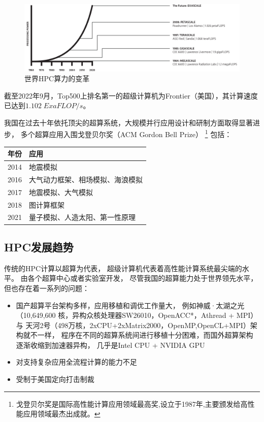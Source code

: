 \begin{figure}[ht!]
    \centering
    \includegraphics[width=\linewidth]{images/evolution-processing-power.png}
    \caption{世界HPC算力的变革}
\end{figure}
截至2022年9月，Top500上排名第一的超级计算机为Frontier（美国），其计算速度已达到$1.102 \;ExaFLOP/s$。

我国在过去十年依托顶尖的超算系统，大规模并行应用设计和研制方面取得显著进步，
多个超算应用入围戈登贝尔奖（ACM Gordon Bell Prize）
\footnote{戈登贝尔奖是国际高性能计算应用领域最高奖,设立于1987年,主要颁发给高性能应用领域最杰出成就。}
包括：
\begin{table}[ht]
\begin{tabularx}{\textwidth}{|p{3cm}|X|}
\toprule
\textbf{年份} & \textbf{应用} \\
\midrule
2014 & 地震模拟 \\
\hline
2016 &  大气动力框架、相场模拟、海浪模拟 \\
\hline
2017 &  地震模拟、大气模拟 \\
\hline
2018 &  图计算框架 \\
\hline
2021 &  量子模拟、人造太阳、第一性原理 \\
\bottomrule
\end{tabularx}
\end{table}

\subsection{HPC发展趋势}
传统的HPC计算以超算为代表，
超级计算机代表着高性能计算系统最尖端的水平。
由各个超算中心或者实验室开发，
尽管我国的超算能力处于世界领先水平，
但也存在着一系列的问题\cite{yef2022_hpc}：

\begin{itemize}
    \item 国产超算平台架构多样，应用移植和调优工作量大，
    例如神威·太湖之光（10,649,600 核，异构众核处理器SW26010，OpenACC*，Athread + MPI）与
    天河2号（498万核，2xCPU+2xMatrix2000，OpenMP,OpenCL+MPI）架构就不一样，
    程序在不同的超算系统间进行移植十分困难，而国外超算架构逐渐收缩到加速器异构，
    几乎是Intel CPU + NVIDIA GPU
    \item 对支持复杂应用全流程计算的能力不足
    \item 受制于美国定向打击制裁
\end{itemize}

